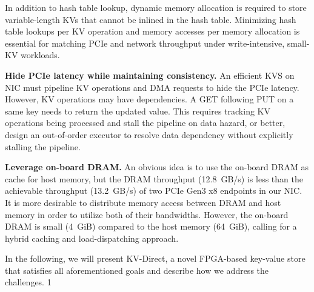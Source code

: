 In addition to hash table lookup, dynamic memory allocation is required to store variable-length KVs that cannot be inlined in the hash table.
Minimizing hash table lookups per KV operation and memory accesses per memory allocation is essential for matching PCIe and network throughput under write-intensive, small-KV workloads.

\textbf{Hide PCIe latency while maintaining consistency.}
An efficient KVS on NIC must pipeline KV operations and DMA requests to hide the PCIe latency.
However, KV operations may have dependencies.
A GET following PUT on a same key needs to return the updated value.
This requires tracking KV operations being processed and stall the pipeline on data hazard, or better, design an out-of-order executor to resolve data dependency without explicitly stalling the pipeline.


\textbf{Leverage on-board DRAM.}
An obvious idea is to use the on-board DRAM as cache for host memory, but the DRAM throughput (12.8~GB/s) is less than the achievable throughput (13.2~GB/s) of two PCIe Gen3 x8 endpoints in our NIC.
It is more desirable to distribute memory access between DRAM and host memory in order to utilize both of their bandwidths.
However, the on-board DRAM is small (4~GiB) compared to the host memory (64~GiB), calling for a hybrid caching and load-dispatching approach.

In the following, we will present KV-Direct, a novel FPGA-based key-value store that satisfies all aforementioned goals and describe how we address the challenges.
1